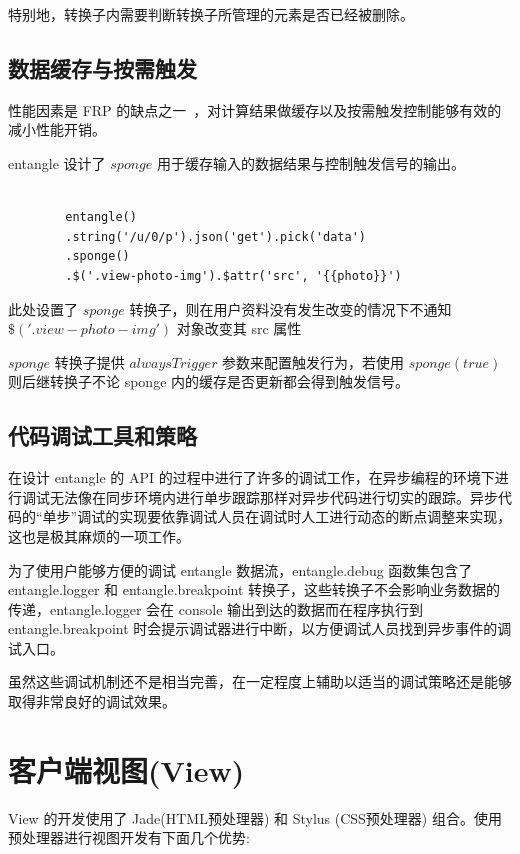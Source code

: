 特别地，转换子内需要判断转换子所管理的元素是否已经被删除。

\subsection{数据缓存与按需触发}

性能因素是 FRP 的缺点之一~\cite{Elliott:2009:PFR:1596638.1596643}，对计算结果做缓存以及按需触发控制能够有效的减小性能开销。

entangle 设计了 $sponge$ 用于缓存输入的数据结果与控制触发信号的输出。

\begin{verbatim}

        entangle()
        .string('/u/0/p').json('get').pick('data')
        .sponge()
        .$('.view-photo-img').$attr('src', '{{photo}}')

\end{verbatim}

此处设置了 $sponge$ 转换子，则在用户资料没有发生改变的情况下不通知 $\$('.view-photo-img')$ 对象改变其 src 属性

$sponge$ 转换子提供 $alwaysTrigger$ 参数来配置触发行为，若使用 $sponge(true)$ 则后继转换子不论 sponge 内的缓存是否更新都会得到触发信号。

\subsection{代码调试工具和策略}

在设计 entangle 的 API 的过程中进行了许多的调试工作，在异步编程的环境下进行调试无法像在同步环境内进行单步跟踪那样对异步代码进行切实的跟踪。异步代码的“单步”调试的实现要依靠调试人员在调试时人工进行动态的断点调整来实现，这也是极其麻烦的一项工作。

为了使用户能够方便的调试 entangle 数据流，entangle.debug 函数集包含了 entangle.logger 和 entangle.breakpoint 转换子，这些转换子不会影响业务数据的传递，entangle.logger 会在 console 输出到达的数据而在程序执行到 entangle.breakpoint 时会提示调试器进行中断，以方便调试人员找到异步事件的调试入口。

虽然这些调试机制还不是相当完善，在一定程度上辅助以适当的调试策略还是能够取得非常良好的调试效果。

\section{客户端视图(View)}

View 的开发使用了 Jade(HTML预处理器) 和 Stylus (CSS预处理器) 组合。使用预处理器进行视图开发有下面几个优势:

